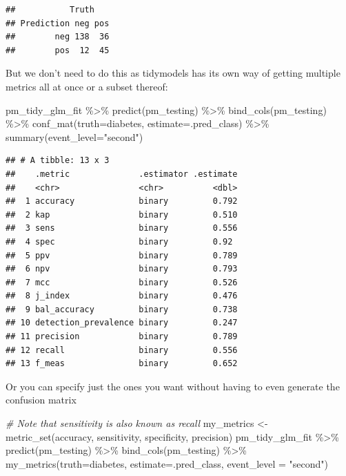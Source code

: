\documentclass[
]{article}
\newenvironment{Shaded}{\begin{snugshade}}{\end{snugshade}}
\newcommand{\AttributeTok}[1]{\textcolor[rgb]{0.77,0.63,0.00}{#1}}
\newcommand{\CommentTok}[1]{\textcolor[rgb]{0.56,0.35,0.01}{\textit{#1}}}
\newcommand{\FunctionTok}[1]{\textcolor[rgb]{0.00,0.00,0.00}{#1}}
\newcommand{\NormalTok}[1]{#1}
\newcommand{\OtherTok}[1]{\textcolor[rgb]{0.56,0.35,0.01}{#1}}
\newcommand{\SpecialCharTok}[1]{\textcolor[rgb]{0.00,0.00,0.00}{#1}}
\newcommand{\StringTok}[1]{\textcolor[rgb]{0.31,0.60,0.02}{#1}}
\begin{document}
\begin{verbatim}
##           Truth
## Prediction neg pos
##        neg 138  36
##        pos  12  45
\end{verbatim}

But we don't need to do this as tidymodels has its own way of getting
multiple metrics all at once or a subset thereof:

\begin{Shaded}
\begin{Highlighting}[]
\NormalTok{pm\_tidy\_glm\_fit }\SpecialCharTok{\%\textgreater{}\%}
  \FunctionTok{predict}\NormalTok{(pm\_testing) }\SpecialCharTok{\%\textgreater{}\%}
  \FunctionTok{bind\_cols}\NormalTok{(pm\_testing) }\SpecialCharTok{\%\textgreater{}\%}
  \FunctionTok{conf\_mat}\NormalTok{(}\AttributeTok{truth=}\NormalTok{diabetes, }\AttributeTok{estimate=}\NormalTok{.pred\_class) }\SpecialCharTok{\%\textgreater{}\%} 
  \FunctionTok{summary}\NormalTok{(}\AttributeTok{event\_level=}\StringTok{"second"}\NormalTok{)}
\end{Highlighting}
\end{Shaded}

\begin{verbatim}
## # A tibble: 13 x 3
##    .metric              .estimator .estimate
##    <chr>                <chr>          <dbl>
##  1 accuracy             binary         0.792
##  2 kap                  binary         0.510
##  3 sens                 binary         0.556
##  4 spec                 binary         0.92 
##  5 ppv                  binary         0.789
##  6 npv                  binary         0.793
##  7 mcc                  binary         0.526
##  8 j_index              binary         0.476
##  9 bal_accuracy         binary         0.738
## 10 detection_prevalence binary         0.247
## 11 precision            binary         0.789
## 12 recall               binary         0.556
## 13 f_meas               binary         0.652
\end{verbatim}

Or you can specify just the ones you want without having to even
generate the confusion matrix

\begin{Shaded}
\begin{Highlighting}[]
\CommentTok{\# Note that sensitivity is also known as recall}
\NormalTok{my\_metrics }\OtherTok{\textless{}{-}} \FunctionTok{metric\_set}\NormalTok{(accuracy, sensitivity, specificity, precision)}
\NormalTok{pm\_tidy\_glm\_fit }\SpecialCharTok{\%\textgreater{}\%}
  \FunctionTok{predict}\NormalTok{(pm\_testing) }\SpecialCharTok{\%\textgreater{}\%}
  \FunctionTok{bind\_cols}\NormalTok{(pm\_testing) }\SpecialCharTok{\%\textgreater{}\%}
  \FunctionTok{my\_metrics}\NormalTok{(}\AttributeTok{truth=}\NormalTok{diabetes, }\AttributeTok{estimate=}\NormalTok{.pred\_class, }\AttributeTok{event\_level =} \StringTok{"second"}\NormalTok{) }
\end{Highlighting}
\end{Shaded}
\end{document}
